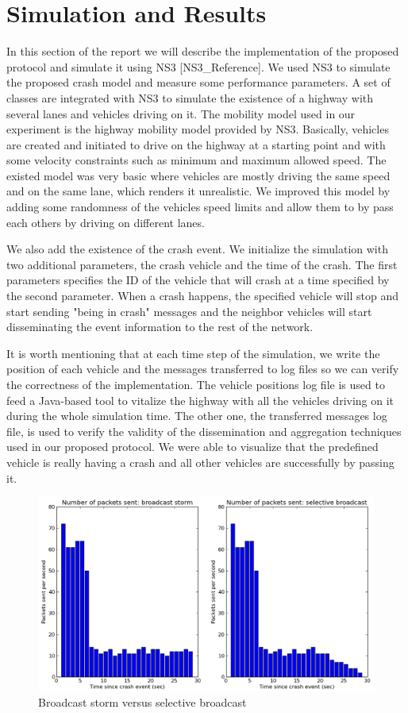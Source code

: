 \documentclass{IEEEtran}
\begin{document}
\section{Simulation and Results}
In this section of the report we will describe the implementation of the proposed protocol and simulate it using NS3 [NS3\_Reference]. We used NS3 to simulate the proposed crash model and measure some performance parameters. A set of classes are integrated with NS3 to simulate the existence of a highway with several lanes and vehicles driving on it. The mobility model used in our experiment is the highway mobility model provided by NS3. Basically, vehicles are created and initiated to drive on the highway at a starting point and with some velocity constraints such as minimum and maximum allowed speed. The existed model was very basic where vehicles are mostly driving the same speed and on the same lane, which renders it unrealistic. We improved this model by adding some randomness of the vehicles speed limits and allow them to by pass each others by driving on different lanes.

We also add the existence of the crash event. We initialize the simulation with two additional parameters, the crash vehicle and the time of the crash. The first parameters specifies the ID of the vehicle that will crash at a time specified by the second parameter. When a crash happens, the specified vehicle will stop and start sending "being in crash" messages and the neighbor vehicles will start disseminating the event information to the rest of the network.

It is worth mentioning that at each time step of the simulation, we write the position of each vehicle and the messages transferred to log files so we can verify the correctness of the implementation. The vehicle positions log file is used to feed a Java-based tool to vitalize the highway with all the vehicles driving on it during the whole simulation time. The other one, the transferred messages log file, is used to verify the validity of the dissemination and aggregation techniques used in our proposed protocol. We were able to visualize that the predefined vehicle is really having a crash and all other vehicles are successfully by passing it.

\noindent
\begin{figure}[h]
\centering
\includegraphics[scale=0.32]{Figure_01.png}
\caption{Broadcast storm versus selective broadcast}
\label{fig_storm_nostorm}
\end{figure}
\end{document}
